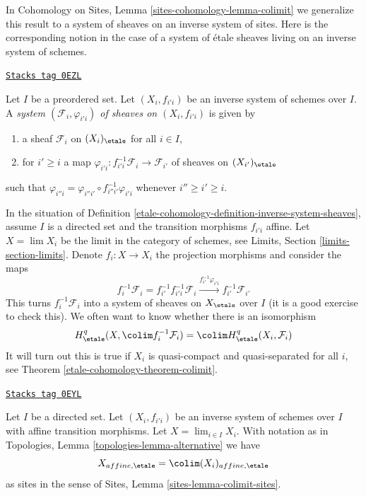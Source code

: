 \medskip\noindent
In Cohomology on Sites, Lemma \ref{sites-cohomology-lemma-colimit}
we generalize this result to a system of sheaves
on an inverse system of sites. Here is the corresponding
notion in the case of a system of \'etale sheaves living
on an inverse system of schemes.

\begin{definition}
\label{etale-cohomology-definition-inverse-system-sheaves}
\href{https://stacks.math.columbia.edu/tag/0EZL}{\texttt{Stacks tag 0EZL}}

Let $I$ be a preordered set. Let $(X_i, f_{i'i})$ be an inverse
system of schemes over $I$.
A {\it system $(\mathcal{F}_i, \varphi_{i'i})$ of sheaves
on $(X_i, f_{i'i})$} is given by
\begin{enumerate}
\item a sheaf $\mathcal{F}_i$ on $(X_i)_\etale$ for all $i \in I$,
\item for $i' \geq i$ a map
$\varphi_{i'i} : f_{i'i}^{-1}\mathcal{F}_i \to \mathcal{F}_{i'}$
of sheaves on $(X_{i'})_\etale$
\end{enumerate}
such that $\varphi_{i''i} = \varphi_{i''i'} \circ f_{i'' i'}^{-1}\varphi_{i'i}$
whenever $i'' \geq i' \geq i$.
\end{definition}

In the situation of Definition \ref{etale-cohomology-definition-inverse-system-sheaves},
assume $I$ is a directed set and the transition morphisms $f_{i'i}$ affine.
Let $X = \lim X_i$ be the limit in the category of schemes, see
Limits, Section \ref{limits-section-limits}.
Denote $f_i : X \to X_i$ the projection morphisms and consider the maps
$$
f_i^{-1}\mathcal{F}_i = f_{i'}^{-1}f_{i'i}^{-1}\mathcal{F}_i
\xrightarrow{f_{i'}^{-1}\varphi_{i'i}}
f_{i'}^{-1}\mathcal{F}_{i'}
$$
This turns $f_i^{-1}\mathcal{F}_i$ into a system of sheaves on $X_\etale$
over $I$ (it is a good exercise to check this).
We often want to know whether there is an isomorphism
$$
H^q_\etale(X, \colim f_i^{-1}\mathcal{F}_i) =
\colim H^q_\etale(X_i, \mathcal{F}_i)
$$
It will turn out this is true if $X_i$ is quasi-compact and quasi-separated
for all $i$, see Theorem \ref{etale-cohomology-theorem-colimit}.

\begin{lemma}
\label{etale-cohomology-lemma-colimit-affine-sites}
\href{https://stacks.math.columbia.edu/tag/0EYL}{\texttt{Stacks tag 0EYL}}

Let $I$ be a directed set. Let $(X_i, f_{i'i})$ be an inverse
system of schemes over $I$ with affine transition morphisms.
Let $X = \lim_{i \in I} X_i$. With
notation as in Topologies, Lemma \ref{topologies-lemma-alternative} we have
$$
X_{affine, \etale} = \colim (X_i)_{affine, \etale}
$$
as sites in the sense of
Sites, Lemma \ref{sites-lemma-colimit-sites}.
\end{lemma}

